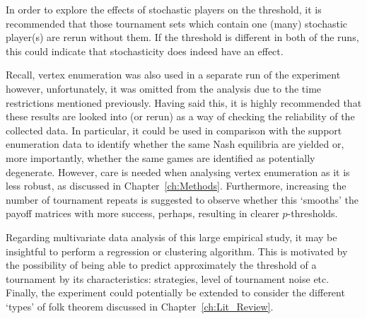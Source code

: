 In order to explore the effects of stochastic players on the threshold, it is
recommended that those tournament sets which contain one (many) stochastic
player(s) are rerun without them. If the threshold is different in both of the
runs, this could indicate that stochasticity does indeed have an effect.

Recall, vertex enumeration was also used in a separate run of the experiment
however, unfortunately, it was omitted from the analysis due to the time
restrictions mentioned previously. Having said this, it is highly recommended
that these results are looked into (or rerun) as a way of checking the
reliability of the collected data. In particular, it could be used in comparison
with the support enumeration data to identify whether the same Nash equilibria
are yielded or, more importantly, whether the same games are identified as
potentially degenerate. However, care is needed when analysing vertex
enumeration as it is less robust, as discussed in Chapter~\ref{ch:Methods}.
Furthermore, increasing the number of tournament repeats is suggested to observe
whether this `smooths' the payoff matrices with more success, perhaps, resulting
in clearer \(p\)-thresholds.

Regarding multivariate data analysis of this large empirical study, it may be
insightful to perform a regression or clustering algorithm. This is motivated by
the possibility of being able to predict approximately the threshold of a
tournament by its characteristics: strategies, level of tournament noise etc.
Finally, the experiment could potentially be extended to consider the different
`types' of folk theorem discussed in Chapter~\ref{ch:Lit_Review}. 